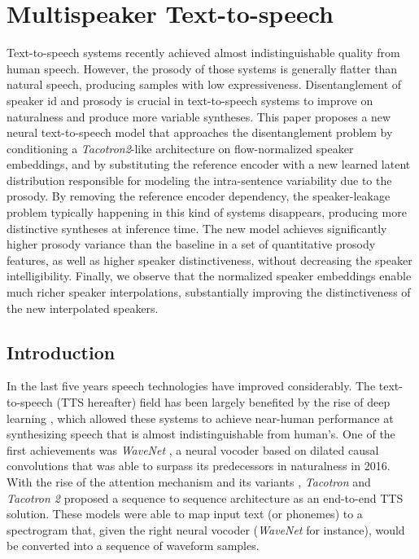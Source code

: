 \chapter{Multispeaker Text-to-speech} \label{ch:tts}

Text-to-speech systems recently achieved almost indistinguishable quality from human speech. However, the prosody of those systems is generally flatter than natural speech, producing samples with low expressiveness. Disentanglement of speaker id and prosody is crucial in text-to-speech systems to improve on naturalness and produce more variable syntheses. This paper proposes a new neural text-to-speech model that approaches the disentanglement problem by conditioning a \textit{Tacotron2}-like architecture on flow-normalized speaker embeddings, and by substituting the reference encoder with a new learned latent distribution responsible for modeling the intra-sentence variability due to the prosody. By removing the reference encoder dependency, the speaker-leakage problem typically happening in this kind of systems disappears, producing more distinctive syntheses at inference time. The new model achieves significantly higher prosody variance than the baseline in a set of quantitative prosody features, as well as higher speaker distinctiveness, without decreasing the speaker intelligibility. Finally, we observe that the normalized speaker embeddings enable much richer speaker interpolations, substantially improving the distinctiveness of the new interpolated speakers.


\section{Introduction}
In the last five years speech technologies have improved considerably. The text-to-speech (TTS hereafter) field has been largely benefited by the rise of deep learning \cite{Sisman2021}, which allowed these systems to achieve near-human performance at synthesizing speech that is almost indistinguishable from human's. One of the first achievements was \textit{WaveNet} \cite{vanderoord2016}, a neural vocoder based on dilated causal convolutions that was able to surpass its predecessors in naturalness in 2016. With the rise of the attention mechanism and its variants \cite{bahdanau2015,vaswani2017,chaudhari2019}, \textit{Tacotron} \cite{Wang2017} and \textit{Tacotron 2} \cite{Shen2018,Liu2019} proposed a sequence to sequence architecture as an end-to-end TTS solution. These models were able to map input text (or phonemes) to a spectrogram that, given the right neural vocoder (\textit{WaveNet} for instance), would be converted into a sequence of waveform samples. 


